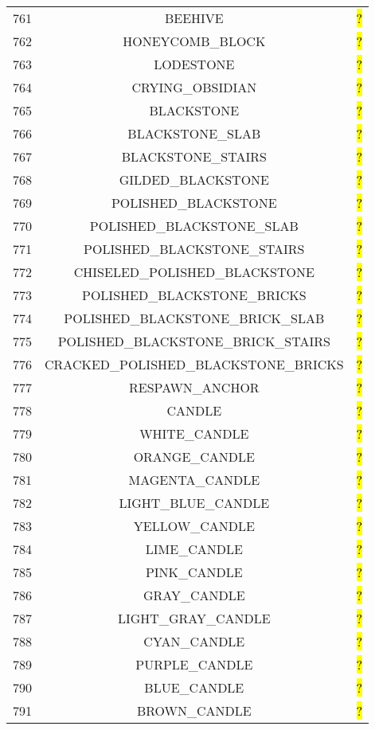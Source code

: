 \documentclass[11pt]{article}
\newcommand\myworries[1]{\sethlcolor{red}\hl{#1}}
\begin{document}
\begin{longtable}{ |c|c|c| }
	761 & BEEHIVE & \myworries{?} \\
	762 & HONEYCOMB\_BLOCK & \myworries{?} \\
	763 & LODESTONE & \myworries{?} \\
	764 & CRYING\_OBSIDIAN & \myworries{?} \\
	765 & BLACKSTONE & \myworries{?} \\
	766 & BLACKSTONE\_SLAB & \myworries{?} \\
	767 & BLACKSTONE\_STAIRS & \myworries{?} \\
	768 & GILDED\_BLACKSTONE & \myworries{?} \\
	769 & POLISHED\_BLACKSTONE & \myworries{?} \\
	770 & POLISHED\_BLACKSTONE\_SLAB & \myworries{?} \\
	771 & POLISHED\_BLACKSTONE\_STAIRS & \myworries{?} \\
	772 & CHISELED\_POLISHED\_BLACKSTONE & \myworries{?} \\
	773 & POLISHED\_BLACKSTONE\_BRICKS & \myworries{?} \\
	774 & POLISHED\_BLACKSTONE\_BRICK\_SLAB & \myworries{?} \\
	775 & POLISHED\_BLACKSTONE\_BRICK\_STAIRS & \myworries{?} \\
	776 & CRACKED\_POLISHED\_BLACKSTONE\_BRICKS & \myworries{?} \\
	777 & RESPAWN\_ANCHOR & \myworries{?} \\
	778 & CANDLE & \myworries{?} \\
	779 & WHITE\_CANDLE & \myworries{?} \\
	780 & ORANGE\_CANDLE & \myworries{?} \\
	781 & MAGENTA\_CANDLE & \myworries{?} \\
	782 & LIGHT\_BLUE\_CANDLE & \myworries{?} \\
	783 & YELLOW\_CANDLE & \myworries{?} \\
	784 & LIME\_CANDLE & \myworries{?} \\
	785 & PINK\_CANDLE & \myworries{?} \\
	786 & GRAY\_CANDLE & \myworries{?} \\
	787 & LIGHT\_GRAY\_CANDLE & \myworries{?} \\
	788 & CYAN\_CANDLE & \myworries{?} \\
	789 & PURPLE\_CANDLE & \myworries{?} \\
	790 & BLUE\_CANDLE & \myworries{?} \\
	791 & BROWN\_CANDLE & \myworries{?} \\

\end{longtable}
\end{document}

